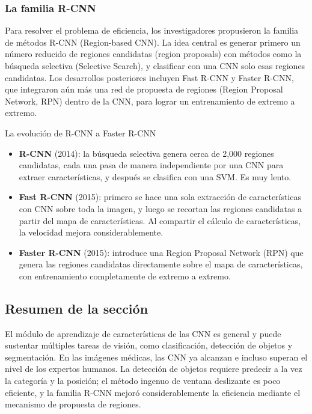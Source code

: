 \subsubsection{La familia R-CNN}

Para resolver el problema de eficiencia, los investigadores propusieron la familia de métodos R-CNN (Region-based CNN). La idea central es generar primero un número reducido de regiones candidatas (region proposals) con métodos como la búsqueda selectiva (Selective Search), y clasificar con una CNN solo esas regiones candidatas. Los desarrollos posteriores incluyen Fast R-CNN y Faster R-CNN, que integraron aún más una red de propuesta de regiones (Region Proposal Network, RPN) dentro de la CNN, para lograr un entrenamiento de extremo a extremo.

\begin{knowledgebox}{La evolución de R-CNN a Faster R-CNN}
\begin{itemize}
    \item \textbf{R-CNN} (2014): la búsqueda selectiva genera cerca de 2,000 regiones candidatas, cada una pasa de manera independiente por una CNN para extraer características, y después se clasifica con una SVM. Es muy lento.
    \item \textbf{Fast R-CNN} (2015): primero se hace una sola extracción de características con CNN sobre toda la imagen, y luego se recortan las regiones candidatas a partir del mapa de características. Al compartir el cálculo de características, la velocidad mejora considerablemente.
    \item \textbf{Faster R-CNN} (2015): introduce una Region Proposal Network (RPN) que genera las regiones candidatas directamente sobre el mapa de características, con entrenamiento completamente de extremo a extremo.
\end{itemize}
\end{knowledgebox}

\subsection{Resumen de la sección}

El módulo de aprendizaje de características de las CNN es general y puede sustentar múltiples tareas de visión, como clasificación, detección de objetos y segmentación. En las imágenes médicas, las CNN ya alcanzan e incluso superan el nivel de los expertos humanos. La detección de objetos requiere predecir a la vez la categoría y la posición; el método ingenuo de ventana deslizante es poco eficiente, y la familia R-CNN mejoró considerablemente la eficiencia mediante el mecanismo de propuesta de regiones.

\newpage
